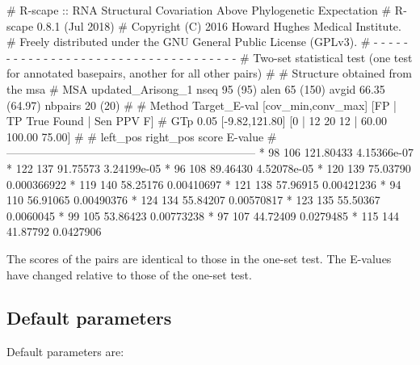 \begin{sreoutput}
# R-scape :: RNA Structural Covariation Above Phylogenetic Expectation
# R-scape 0.8.1 (Jul 2018)
# Copyright (C) 2016 Howard Hughes Medical Institute.
# Freely distributed under the GNU General Public License (GPLv3).
# - - - - - - - - - - - - - - - - - - - - - - - - - - - - - - - - - - - -
# Two-set statistical test (one test for annotated basepairs, another for all other pairs)
#
# Structure obtained from the msa
# MSA updated_Arisong_1 nseq 95 (95) alen 65 (150) avgid 66.35 (64.97) nbpairs 20 (20)
#
# Method Target_E-val [cov_min,conv_max] [FP | TP True Found | Sen PPV F] 
# GTp    0.05         [-9.82,121.80]     [0 | 12 20 12 | 60.00 100.00 75.00] 
#
#       left_pos       right_pos        score           E-value
#------------------------------------------------------------------
*	      98	     106	121.80433	4.15366e-07
*	     122	     137	91.75573	3.24199e-05
*	      96	     108	89.46430	4.52078e-05
*	     120	     139	75.03790	0.000366922
*	     119	     140	58.25176	0.00410697
*	     121	     138	57.96915	0.00421236
*	      94	     110	56.91065	0.00490376
*	     124	     134	55.84207	0.00570817
*	     123	     135	55.50367	0.0060045
*	      99	     105	53.86423	0.00773238
*	      97	     107	44.72409	0.0279485
*	     115	     144	41.87792	0.0427906
\end{sreoutput}
The scores of the pairs are identical to those in the one-set
test. The E-values have changed relative to those of the one-set test.

\subsection{Default parameters}

Default parameters are:

